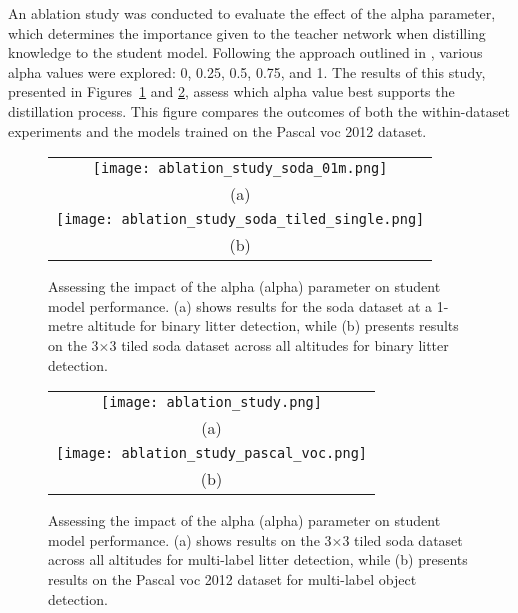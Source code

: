 An ablation study was conducted to evaluate the effect of the \gls{alpha} parameter, which determines the importance given to the teacher network when distilling knowledge to the student model. Following the approach outlined in \cite{lab2wild}, various \gls{alpha} values were explored: 0, 0.25, 0.5, 0.75, and 1. The results of this study, presented in Figures~\ref{fig:ablation_combined} and \ref{fig:ablation_combined2}, assess which \gls{alpha} value best supports the distillation process. This figure compares the outcomes of both the within-dataset experiments and the models trained on the Pascal \gls{voc} 2012 dataset.

\begin{figure}[!ht]
    \centering
    \begin{tabular}{c}
        \texttt{[image: ablation\_study\_soda\_01m.png]} \\
        \small (a) \\
        \addlinespace[1em]
        \texttt{[image: ablation\_study\_soda\_tiled\_single.png]} \\
        \small (b) \\
    \end{tabular}
    \caption{Assessing the impact of the alpha (\gls{alpha}) parameter on student model performance. 
    (a) shows results for the \gls{soda} dataset at a 1-metre altitude for binary litter detection, while 
    (b) presents results on the 3$\times$3 tiled \gls{soda} dataset across all altitudes for binary litter detection.}
    \label{fig:ablation_combined}
\end{figure}

\begin{figure}[!ht]
    \centering
    \begin{tabular}{c}
        \texttt{[image: ablation\_study.png]} \\
        \small (a) \\
        \addlinespace[1em]
        \texttt{[image: ablation\_study\_pascal\_voc.png]} \\
        \small (b) \\
    \end{tabular}
    \caption{Assessing the impact of the alpha (\gls{alpha}) parameter on student model performance. 
    (a) shows results on the 3$\times$3 tiled \gls{soda} dataset across all altitudes for multi-label litter detection, while 
    (b) presents results on the Pascal \gls{voc} 2012 dataset for multi-label object detection.}
    \label{fig:ablation_combined2}
\end{figure}


